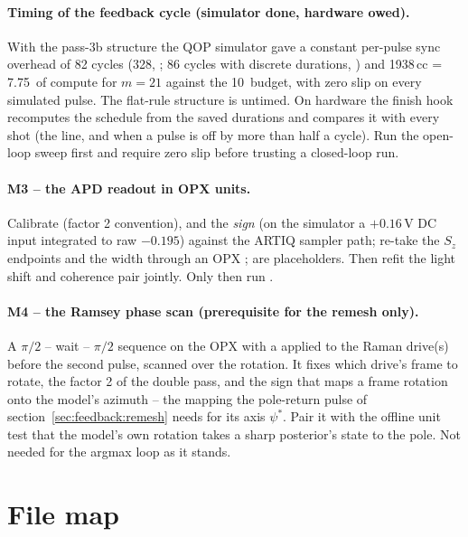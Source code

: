 \paragraph{Timing of the feedback cycle (simulator done, hardware owed).}
With the pass-3b structure the QOP simulator gave a constant per-pulse sync
overhead of 82 cycles (328\nsu, ; 86
cycles with discrete durations, ) and 1938\,cc = 7.75\us\ of
compute for $m = 21$ against the 10\us\ budget, with zero slip on every
simulated pulse. The flat-rule structure is untimed. On hardware the finish
hook recomputes the schedule from the saved durations and compares it with
 every shot (the  line, and
\code{***} when a pulse is off by more than half a cycle). Run the open-loop
sweep first and require zero slip before trusting a closed-loop run.

\paragraph{M3 -- the APD readout in OPX units.} Calibrate 
(factor 2 convention),  and the \emph{sign} (on the
simulator a $+0.16$\,V DC input integrated to raw $-0.195$) against the ARTIQ
sampler path; re-take the $S_z$ endpoints  and
the width  through an OPX ;
 are placeholders. Then refit the light
shift and coherence pair jointly. Only then run .

\paragraph{M4 -- the Ramsey phase scan (prerequisite for the remesh only).}
A $\pi/2$ -- wait -- $\pi/2$ sequence on the OPX with a
 applied to the Raman drive(s) before the second
pulse, scanned over the rotation. It fixes which drive's frame to rotate, the
factor 2 of the double pass, and the sign that maps a frame rotation onto the
model's azimuth -- the mapping the pole-return pulse of
section~\ref{sec:feedback:remesh} needs for its axis $\psi^*$. Pair it with the
offline unit test that the model's own rotation takes a sharp posterior's
state to the pole. Not needed for the argmax loop as it stands.

\section{File map}
\label{sec:filemap}

